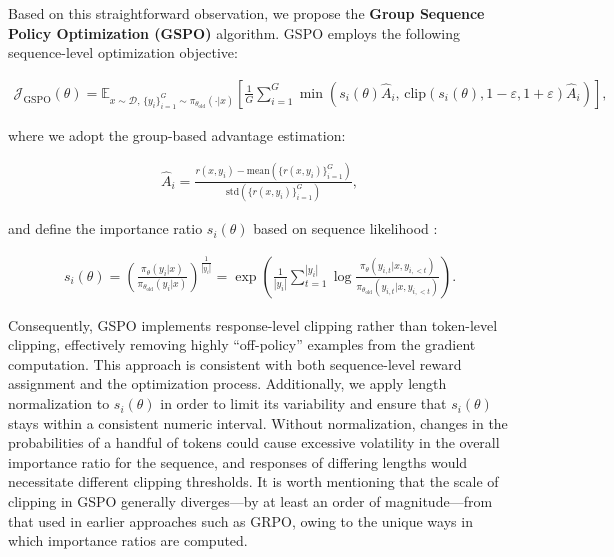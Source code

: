 Based on this straightforward observation, we propose the \textbf{Group Sequence Policy Optimization (GSPO)} algorithm. GSPO employs the following sequence-level optimization objective:

\begin{align}
\mathcal{J}_\text{GSPO} (\theta) =
\mathbb{E}_{ x \sim \mathcal{D},\, \{y_i\}_{i=1}^G \sim \pi_{\theta_\text{old}}( \cdot | x) }
\left[ 
\frac{1}{G} \sum_{i=1}^{G}
\min \left( s_{i}(\theta)  \widehat{A}_{i},  \, \mathrm{clip} \left( s_{i}(\theta), 1 - {\varepsilon}, 1 + {\varepsilon} \right) \widehat{A}_{i} \right) 
\right],
\label{equ:gspo}
\end{align}

where we adopt the group-based advantage estimation:

\begin{align}
\widehat{A}_{i} = \frac{r(x, y_i) - \mathrm{mean} \left( \{ r(x, y_i) \}_{i=1}^G \right) }{ \mathrm{std} \left( \{ r(x, y_i) \}_{i=1}^G \right) },
\end{align}

and define the importance ratio $s_{i}(\theta)$ based on sequence likelihood \citep{click}:

\begin{align}
s_{i}(\theta) = \left( \frac{ \pi_{\theta} (y_i | x) }{ \pi_{\theta_\text{old}} (y_i | x)} \right)^{\frac{1}{|y_i|}}
=
\exp \left( \frac{1}{|y_i|} \sum_{t=1}^{|y_i|} \log \frac{ \pi_{\theta} (y_{i,t} | x, y_{i,<t}) }{ \pi_{\theta_\text{old}} (y_{i,t} | x,y_{i,<t})} \right).
\end{align}

Consequently, GSPO implements response-level clipping rather than token-level clipping, effectively removing highly ``off-policy'' examples from the gradient computation. This approach is consistent with both sequence-level reward assignment and the optimization process. Additionally, we apply length normalization to $s_{i}(\theta)$ in order to limit its variability and ensure that $s_{i}(\theta)$ stays within a consistent numeric interval. Without normalization, changes in the probabilities of a handful of tokens could cause excessive volatility in the overall importance ratio for the sequence, and responses of differing lengths would necessitate different clipping thresholds. It is worth mentioning that the scale of clipping in GSPO generally diverges—by at least an order of magnitude—from that used in earlier approaches such as GRPO, owing to the unique ways in which importance ratios are computed.

